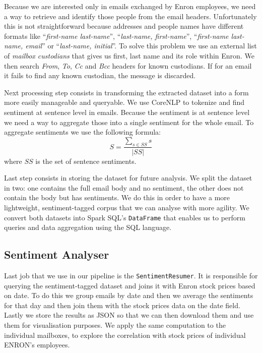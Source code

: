 \documentclass{vldb}
\begin{document}
Because we are interested only in emails exchanged by Enron employees, we need a
way to retrieve and identify those people from the email headers. Unfortunately
this is not straightforward because addresses and people names have different
formats like ``\textit{first-name last-name}'', ``\textit{last-name, first-name}'',
``\textit{first-name last-name, email}'' or ``\textit{last-name, initial}''.
To solve this problem we use an external list of \textit{mailbox custodians}
that gives us first, last name and its role within Enron. We then search
\textit{From}, \textit{To}, \textit{Cc} and \textit{Bcc} headers for known
custodians. If for an email it fails to find any known custodian, the message is
discarded.

Next processing step consists in transforming the extracted dataset into a form
more easily manageable and queryable. We use CoreNLP to tokenize and find
sentiment at sentence level in emails. Because the sentiment is at sentence
level we need a way to aggregate those into a single sentiment for the whole
email. To aggregate sentiments we use the following formula:
\begin{equation}
	S = \frac{\sum_{s \in SS} s}{|SS|}
	\label{eq:sentiment-aggregation}
\end{equation}
where $SS$ is the set of sentence sentiments.

Last step consists in storing the dataset for future analysis. We split the
dataset in two: one contains the full email body and no sentiment, the other
does not contain the body but has sentiments. We do this in order to have a more
lightweight, sentiment-tagged corpus that we can analyse with more agility. We
convert both datasets into Spark SQL's \texttt{DataFrame} that enables us to
perform queries and data aggregation using the SQL language.

\subsection{Sentiment Analyser}
\label{sub-sec:sentiment-analyser}
Last job that we use in our pipeline is the \texttt{SentimentResumer}. It is
responsible for querying the sentiment-tagged dataset and joins it with Enron
stock prices based on date. To do this we group emails by date and then we
average the sentiments for that day and then join them with the stock prices
data on the date field. Lastly we store the results as JSON so that we can
then download them and use them for visualisation purposes.
We apply the same computation to the individual mailboxes, to explore the
correlation with stock prices of individual ENRON's employees.
\end{document}
